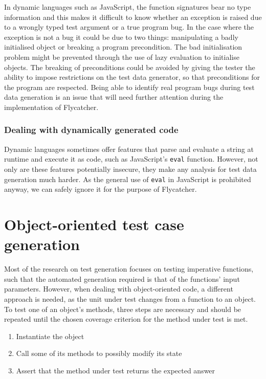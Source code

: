 \documentclass[a4paper,11pt,titlepage]{report}
\begin{document}
In dynamic languages such as JavaScript, the function signatures bear no type information and this makes it difficult to know whether an exception is raised due to a wrongly typed test argument or a true program bug. In the case where the exception is not a bug it could be due to two things: manipulating a badly initialised object or breaking a program precondition. The bad initialisation problem might be prevented through the use of lazy evaluation to initialise objects. The breaking of preconditions could be avoided by giving the tester the ability to impose restrictions on the test data generator, so that preconditions for the program are respected. Being able to identify real program bugs during test data generation is an issue that will need further attention during the implementation of \textsf{Flycatcher}.

\subsubsection{Dealing with dynamically generated code}

Dynamic languages sometimes offer features that parse and evaluate a string at runtime and execute it as code, such as JavaScript's \texttt{eval} function. However, not only are these features potentially insecure, they make any analysis for test data generation much harder. As the general use of \texttt{eval} in JavaScript is prohibited anyway, we can safely ignore it for the purpose of \textsf{Flycatcher}.

\section{Object-oriented test case generation}
Most of the research on test generation focuses on testing imperative functions, such that the automated generation required is that of the functions' input parameters. However, when dealing with object-oriented code, a different approach is needed, as the unit under test changes from a function to an object. To test one of an object's methods, three steps are necessary \cite{tonella2004evolutionary} and should be repeated until the chosen coverage criterion for the method under test is met.
\begin{enumerate}
	\item Instantiate the object
	\item Call some of its methods to possibly modify its state
	\item Assert that the method under test returns the expected answer
\end{enumerate}
\end{document}

